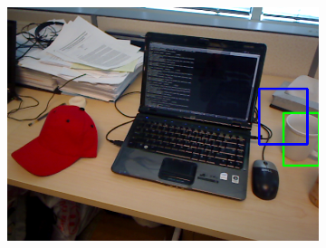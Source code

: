 \begin{figure}
\begin{subfigure}[b]{0.3\textwidth}
		\includegraphics[width=\textwidth]{img/seguimiento_solo_frame/solo_frame-desk_1-coffee_mug_5-frame_31.png}
	\end{subfigure}


\end{figure}
